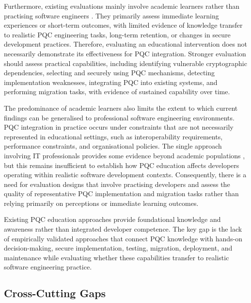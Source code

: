 \documentclass[letterpaper,twocolumn,10pt]{article}
\begin{document}
Furthermore, existing evaluations mainly involve academic learners rather than practising software engineers \cite{Ana_borrelli_towards_2025, Ana_borrelli_designing_2024, Ana_edComScSociety, Ana_PQCLabEdu, Ana_abdelhamid_wip_2024}. They primarily assess immediate learning experiences or short-term outcomes, with limited evidence of knowledge transfer to realistic PQC engineering tasks, long-term retention, or changes in secure development practices. Therefore, evaluating an educational intervention does not necessarily demonstrate its effectiveness for PQC integration. Stronger evaluation should assess practical capabilities, including identifying vulnerable cryptographic dependencies, selecting and securely using PQC mechanisms, detecting implementation weaknesses, integrating PQC into existing systems, and performing migration tasks, with evidence of sustained capability over time.

The predominance of academic learners also limits the extent to which current findings can be generalised to professional software engineering environments. PQC integration in practice occurs under constraints that are not necessarily represented in educational settings, such as interoperability requirements, performance constraints, and organisational policies. The single approach involving IT professionals provides some evidence beyond academic populations \cite{Ana_PQCIP}, but this remains insufficient to establish how PQC education affects developers operating within realistic software development contexts. Consequently, there is a need for evaluation designs that involve practising developers and assess the quality of representative PQC implementation and migration tasks rather than relying primarily on perceptions or immediate learning outcomes.

\begin{tcolorbox}[
title=\textbf{Takeaway},
colback=gray!5,
colframe=black,
boxrule=0.5pt,
arc=0.5mm,
left=0.5mm,
right=0.5mm,
top=0.5mm,
bottom=0.5mm
]
Existing PQC education approaches provide foundational knowledge and awareness rather than integrated developer competence. The key gap is the lack of empirically validated approaches that connect PQC knowledge with hands-on decision-making, secure implementation, testing, migration, deployment, and maintenance while evaluating whether these capabilities transfer to realistic software engineering practice.
\end{tcolorbox}

\subsection{Cross-Cutting Gaps}
\label{DisOverallReady}
\end{document}
